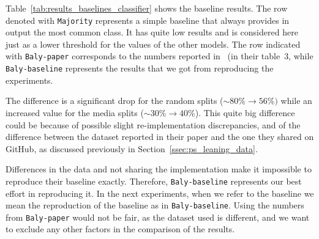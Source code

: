 Table~\ref{tab:results_baselines_classifier} shows the baseline results.
The row denoted with \texttt{Majority} represents a simple baseline that always provides in output the most common class. It has quite low results and is considered here just as a lower threshold for the values of the other models.
The row indicated with \texttt{Baly-paper} corresponds to the numbers reported in~\citet{baly2020we} (in their table~3, while \texttt{Baly-baseline} represents the results that we got from reproducing the experiments.

The difference is a significant drop for the random splits ($\sim80\% \rightarrow 56\%)$  while an increased value for the media splits ($\sim30\% \rightarrow 40\%$).
This quite big difference could be because of possible slight re-implementation discrepancies, and of the difference between the dataset reported in their paper and the one they shared on GitHub, as discussed previously in Section~\ref{ssec:ps_leaning_data}.%

Differences in the data and not sharing the implementation make it impossible to reproduce their baseline exactly.
Therefore, \texttt{Baly-baseline} represents our best effort in reproducing it.
In the next experiments, when we refer to the baseline
we mean the reproduction of the baseline as in \texttt{Baly-baseline}. Using the numbers from \texttt{Baly-paper} would not be fair, as the dataset used is different, and we want to exclude any other factors in the comparison of the results.







